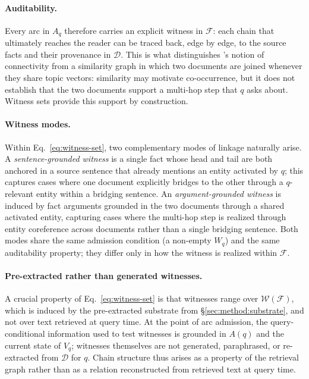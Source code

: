 \paragraph{Auditability.}
Every arc in $A_q$ therefore carries an explicit witness in $\mathcal{F}$:
each chain that ultimately reaches the reader can be traced back, edge by
edge, to the source facts and their provenance in $\mathcal{D}$. This is
what distinguishes \methodname{}'s notion of connectivity from a
similarity graph in which two documents are joined whenever they share
topic vectors: similarity may motivate co-occurrence, but it does not
establish that the two documents support a multi-hop step that $q$ asks
about. Witness sets provide this support by construction.

\paragraph{Witness modes.}
Within Eq.~\eqref{eq:witness-set}, two complementary modes of linkage
naturally arise. A \emph{sentence-grounded witness} is a single fact whose
head and tail are both anchored in a source sentence that already mentions
an entity activated by $q$; this captures cases where one document
explicitly bridges to the other through a $q$-relevant entity within a
bridging sentence. An \emph{argument-grounded witness} is induced by fact
arguments grounded in the two documents through a shared activated
entity, capturing cases where the multi-hop step is realized through
entity coreference across documents rather than a single bridging
sentence. Both modes share the same admission condition (a non-empty
$W_q$) and the same auditability property; they differ only in how the
witness is realized within $\mathcal{F}$.

\paragraph{Pre-extracted rather than generated witnesses.}
A crucial property of Eq.~\eqref{eq:witness-set} is that witnesses range
over $\mathcal{W}(\mathcal{F})$, which is induced by the pre-extracted
substrate from \S\ref{sec:method:substrate}, and not over text retrieved
at query time. At the point of arc admission, the query-conditional
information used to test witnesses is grounded in $A(q)$ and the current
state of $V_q$; witnesses themselves are not generated, paraphrased, or
re-extracted from $\mathcal{D}$ for $q$. Chain structure thus arises as a
property of the retrieval graph rather than as a relation reconstructed
from retrieved text at query time.

